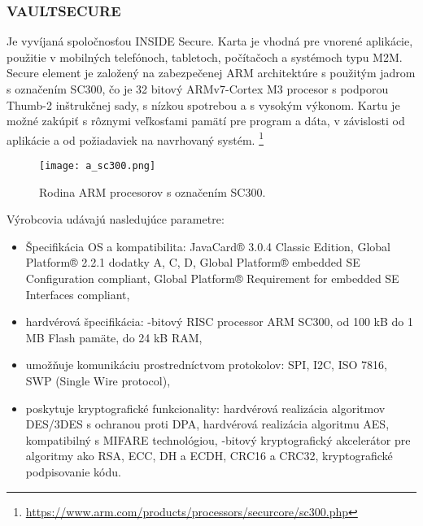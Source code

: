 \documentclass[12pt,a4paper,oneside,openright]{report}
\begin{document}
\subsubsection{VAULTSECURE} \label{s_sd_vault}
Je vyvíjaná spoločnosťou INSIDE Secure. Karta je vhodná pre vnorené aplikácie, použitie v mobilných telefónoch, tabletoch, počítačoch a systémoch typu M2M. 
Secure element je založený na zabezpečenej ARM architektúre s použitým jadrom s označením SC300, čo je 32 bitový ARMv7-Cortex M3 procesor s podporou Thumb-2 inštrukčnej sady, s nízkou spotrebou a s vysokým výkonom. Kartu je možné zakúpiť s rôznymi veľkosťami pamätí pre program a dáta, v závislosti od aplikácie a od požiadaviek na navrhovaný systém. \footnote{\url{https://www.arm.com/products/processors/securcore/sc300.php}}
\begin{figure*}[h]
	\centering
	\texttt{[image: a\_sc300.png]}
	\caption{Rodina ARM procesorov s označením SC300. \cite{sc300}}
	\label{f:o_sc300}
\end{figure*}
Výrobcovia udávajú nasledujúce parametre\cite{vaultsecure}:
\singlespacing
\begin{itemize}
\item Špecifikácia OS a kompatibilita:
\subitem JavaCard® 3.0.4 Classic Edition,
\subitem Global Platform® 2.2.1 dodatky A, C, D,
\subitem Global Platform® embedded SE Configuration compliant,
\subitem Global Platform® Requirement for embedded SE Interfaces compliant,
\item hardvérová špecifikácia:
-bitový RISC processor ARM SC300,
\subitem od 100 kB do 1 MB Flash pamäte,
\subitem do 24 kB RAM,
\item umožňuje komunikáciu prostredníctvom protokolov:
\subitem SPI,
\subitem I2C,
\subitem ISO 7816,
\subitem SWP (Single Wire protocol),
\item poskytuje kryptografické funkcionality:
\subitem hardvérová realizácia algoritmov DES/3DES s ochranou proti DPA,
\subitem hardvérová realizácia algoritmu AES,
\subitem kompatibilný s MIFARE technológiou,
-bitový kryptografický akcelerátor pre algoritmy ako RSA, ECC, DH a ECDH,
\subitem CRC16 a CRC32,
\subitem kryptografické podpisovanie kódu.
\end{itemize}
\onehalfspacing
\end{document}
